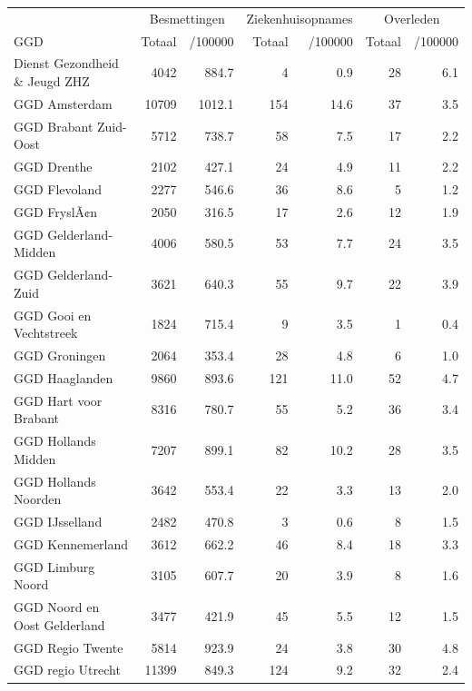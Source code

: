 \documentclass[
  english,
  man,floatsintext]{apa6}
\begin{document}
\begin{table}[H]
\centering\begingroup\fontsize{10}{12}\selectfont

\begin{threeparttable}
\begin{tabular}{lrrrrrr}
\toprule
\multicolumn{1}{c}{ } & \multicolumn{2}{c}{Besmettingen} & \multicolumn{2}{c}{Ziekenhuisopnames} & \multicolumn{2}{c}{Overleden} \\
\cmidrule(l{3pt}r{3pt}){2-3} \cmidrule(l{3pt}r{3pt}){4-5} \cmidrule(l{3pt}r{3pt}){6-7}
GGD & Totaal & /100000 & Totaal & /100000 & Totaal & /100000\\
\midrule
Dienst Gezondheid \& Jeugd ZHZ & 4042 & 884.7 & 4 & 0.9 & 28 & 6.1\\
GGD Amsterdam & 10709 & 1012.1 & 154 & 14.6 & 37 & 3.5\\
GGD Brabant Zuid-Oost & 5712 & 738.7 & 58 & 7.5 & 17 & 2.2\\
GGD Drenthe & 2102 & 427.1 & 24 & 4.9 & 11 & 2.2\\
GGD Flevoland & 2277 & 546.6 & 36 & 8.6 & 5 & 1.2\\
GGD FryslÃ¢n & 2050 & 316.5 & 17 & 2.6 & 12 & 1.9\\
GGD Gelderland-Midden & 4006 & 580.5 & 53 & 7.7 & 24 & 3.5\\
GGD Gelderland-Zuid & 3621 & 640.3 & 55 & 9.7 & 22 & 3.9\\
GGD Gooi en Vechtstreek & 1824 & 715.4 & 9 & 3.5 & 1 & 0.4\\
GGD Groningen & 2064 & 353.4 & 28 & 4.8 & 6 & 1.0\\
GGD Haaglanden & 9860 & 893.6 & 121 & 11.0 & 52 & 4.7\\
GGD Hart voor Brabant & 8316 & 780.7 & 55 & 5.2 & 36 & 3.4\\
GGD Hollands Midden & 7207 & 899.1 & 82 & 10.2 & 28 & 3.5\\
GGD Hollands Noorden & 3642 & 553.4 & 22 & 3.3 & 13 & 2.0\\
GGD IJsselland & 2482 & 470.8 & 3 & 0.6 & 8 & 1.5\\
GGD Kennemerland & 3612 & 662.2 & 46 & 8.4 & 18 & 3.3\\
GGD Limburg Noord & 3105 & 607.7 & 20 & 3.9 & 8 & 1.6\\
GGD Noord en Oost Gelderland & 3477 & 421.9 & 45 & 5.5 & 12 & 1.5\\
GGD Regio Twente & 5814 & 923.9 & 24 & 3.8 & 30 & 4.8\\
GGD regio Utrecht & 11399 & 849.3 & 124 & 9.2 & 32 & 2.4\\

\end{tabular}
\end{threeparttable}
\end{table}
\end{document}
